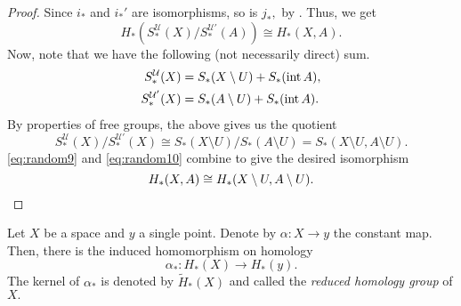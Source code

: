 \documentclass[12pt]{article}
\begin{document}
\begin{proof}
	Since $i_*$ and $i_*'$ are isomorphisms, so is $j_*,$ by . Thus, we get 
	\begin{equation} \tag{$*$} \label{eq:random9}
		H_*(S^{\mathcal{U}}_*(X)/S^{\mathcal{U}'}_*(A)) \cong H_*(X, A).
	\end{equation}
	Now, note that we have the following (not necessarily direct) sum.
	\begin{align*} 
		S_*^{\mathcal{U}}(X) &=	S_*(X \setminus U) + S_*(\operatorname{int} A),\\
		S_*^{\mathcal{U}'}(X) &=	S_*(A \setminus U) + S_*(\operatorname{int} A).
	\end{align*}
	By properties of free groups, the above gives us the quotient
	\begin{equation*} \tag{$\star$} \label{eq:random10}
		S_*^{\mathcal{U}}(X)/S_*^{\mathcal{U}'}(X) \cong S_*(X \setminus U)/S_*(A \setminus U) = S_*(X \setminus U, A \setminus U).
	\end{equation*}
	\cref{eq:random9} and \cref{eq:random10} combine to give the desired isomorphism
	\begin{equation*} 
		H_*(X, A) \cong H_*(X \setminus U, A \setminus U).\qedhere
	\end{equation*}

\end{proof}

\begin{defn}
	Let $X$ be a space and $y$ a single point. Denote by $\alpha:X \to y$ the constant map. Then, there is the induced homomorphism on homology
	\begin{equation*} 
		\alpha_*:H_*(X) \to H_*(y).
	\end{equation*}	
	The kernel of $\alpha_*$ is denoted by $\widetilde{H}_*(X)$ and called the \emph{reduced homology group} of $X.$	
\end{defn}
\end{document}

